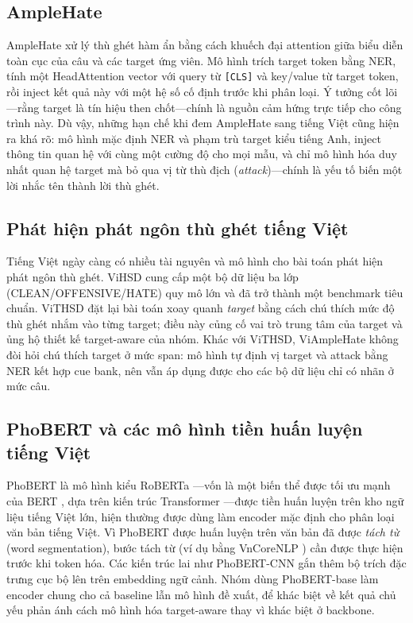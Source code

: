 \documentclass[11pt]{article}
\begin{document}
\subsection{AmpleHate}
AmpleHate \citep{amplehate} xử lý thù ghét hàm ẩn bằng cách khuếch đại attention giữa biểu diễn toàn cục của câu và các target ứng viên. Mô hình trích target token bằng NER, tính một HeadAttention vector với query từ \texttt{[CLS]} và key/value từ target token, rồi inject kết quả này với một hệ số cố định trước khi phân loại. Ý tưởng cốt lõi---rằng target là tín hiệu then chốt---chính là nguồn cảm hứng trực tiếp cho công trình này. Dù vậy, những hạn chế khi đem AmpleHate sang tiếng Việt cũng hiện ra khá rõ: mô hình mặc định NER và phạm trù target kiểu tiếng Anh, inject thông tin quan hệ với cùng một cường độ cho mọi mẫu, và chỉ mô hình hóa duy nhất quan hệ target mà bỏ qua vị từ thù địch (\emph{attack})---chính là yếu tố biến một lời nhắc tên thành lời thù ghét.

\subsection{Phát hiện phát ngôn thù ghét tiếng Việt}
Tiếng Việt ngày càng có nhiều tài nguyên và mô hình cho bài toán phát hiện phát ngôn thù ghét. ViHSD \citep{vihsd} cung cấp một bộ dữ liệu ba lớp (CLEAN/OFFENSIVE/HATE) quy mô lớn và đã trở thành một benchmark tiêu chuẩn. ViTHSD \citep{vithsd} đặt lại bài toán xoay quanh \emph{target} bằng cách chú thích mức độ thù ghét nhắm vào từng target; điều này củng cố vai trò trung tâm của target và ủng hộ thiết kế target-aware của nhóm. Khác với ViTHSD, ViAmpleHate không đòi hỏi chú thích target ở mức span: mô hình tự định vị target và attack bằng NER kết hợp cue bank, nên vẫn áp dụng được cho các bộ dữ liệu chỉ có nhãn ở mức câu.

\subsection{PhoBERT và các mô hình tiền huấn luyện tiếng Việt}
PhoBERT \citep{phobert} là mô hình kiểu RoBERTa \citep{roberta}---vốn là một biến thể được tối ưu mạnh của BERT \citep{bert}, dựa trên kiến trúc Transformer \citep{transformer}---được tiền huấn luyện trên kho ngữ liệu tiếng Việt lớn, hiện thường được dùng làm encoder mặc định cho phân loại văn bản tiếng Việt. Vì PhoBERT được huấn luyện trên văn bản đã được \emph{tách từ} (word segmentation), bước tách từ (ví dụ bằng VnCoreNLP \citep{vncorenlp}) cần được thực hiện trước khi token hóa. Các kiến trúc lai như PhoBERT-CNN \citep{to2022phobertcnn} gắn thêm bộ trích đặc trưng cục bộ lên trên embedding ngữ cảnh. Nhóm dùng PhoBERT-base làm encoder chung cho cả baseline lẫn mô hình đề xuất, để khác biệt về kết quả chủ yếu phản ánh cách mô hình hóa target-aware thay vì khác biệt ở backbone.
\end{document}
